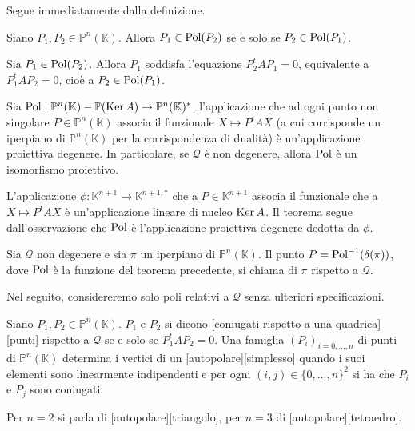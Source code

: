 \Proof Segue immediatamente dalla definizione. \EndProof
\begin{Theorem}\label{th59}
	Siano $P_1, P_2 \in \mathbb{P}^n(\mathbb{K})$. Allora $P_1 \in \operatorname{Pol}(P_2)$ se e solo se $P_2 \in \operatorname{Pol}(P_1)$.
\end{Theorem}
\Proof Sia $P_1 \in \operatorname{Pol}(P_2)$. Allora $P_1$ soddisfa l'equazione $P_2^tAP_1 = 0$, equivalente a $P_1^tAP_2 = 0$, cio\`e a $P_2 \in \operatorname{Pol}(P_1)$.\EndProof
\begin{Theorem}\label{th57}
	Sia $\operatorname{Pol}: \mathbb{P}^n(\mathbb{K}) - \mathbb{P}(\operatorname{Ker} A) \rightarrow \mathbb{P}^n(\mathbb{K})^*$, l'applicazione che ad ogni punto non singolare $P \in \mathbb{P}^n(\mathbb{K})$ associa il funzionale $X \mapsto P^tAX$  (a cui corrisponde un iperpiano di $\mathbb{P}^n(\mathbb{K})$ per la corrispondenza di dualit\`a) \`e un'applicazione proiettiva degenere. In particolare, se $\mathcal{Q}$ \`e non degenere, allora $\operatorname{Pol}$ \`e un isomorfismo proiettivo.
\end{Theorem}
\Proof L'applicazione $\phi: \mathbb{K}^{n + 1} \rightarrow \mathbb{K}^{n+1,*}$ che a $P \in \mathbb{K}^{n + 1}$ associa il funzionale che a $X \mapsto P^tAX$ \`e un'applicazione lineare di nucleo $\operatorname{Ker} A$. Il teorema segue dall'osservazione che $\operatorname{Pol}$ \`e l'applicazione proiettiva degenere dedotta da $\phi$. \EndProof
\begin{Definition}\label{def52}
	Sia $\mathcal{Q}$ non degenere e sia $\pi$ un iperpiano di $\mathbb{P}^n(\mathbb{K})$. Il punto $P = \operatorname{Pol}^{-1}(\delta(\pi))$, dove $\operatorname{Pol}$ \`e la funzione del teorema precedente, si chiama  di $\pi$ rispetto a $\mathcal{Q}$.
\end{Definition}
	\par Nel seguito, considereremo solo poli relativi a $\mathcal{Q}$ senza ulteriori specificazioni.
\begin{Definition}\label{def53}
	Siano $P_1, P_2 \in \mathbb{P}^n(\mathbb{K})$. $P_1$ e $P_2$ si dicono [coniugati rispetto a una quadrica][punti] rispetto a $\mathcal{Q}$ se e solo se $P_1^tAP_2 = 0$. Una famiglia $(P_i)_{i = 0, ..., n}$ di punti di $\mathbb{P}^n(\mathbb{K})$ determina i vertici di un [autopolare][simplesso] quando i suoi elementi sono linearmente indipendenti e per ogni $(i, j) \in \lbrace 0, ..., n \rbrace^2$ si ha che $P_i$ e $P_j$ sono coniugati.
\end{Definition}
	\par Per $n = 2$ si parla di [autopolare][triangolo], per $n = 3$ di [autopolare][tetraedro].
